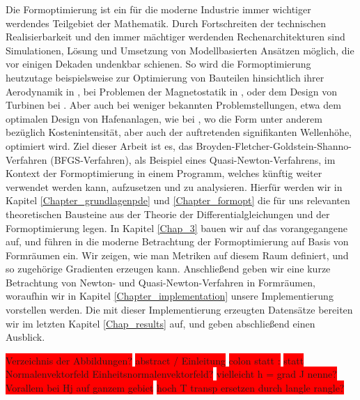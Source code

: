 \documentclass[bibliography=totoc,12pt,a4paper]{scrartcl}
\theoremstyle{exampstyle}
\numberwithin{equation}{section}
\renewenvironment{abstract}
 {\small
  \begin{center}
  \bfseries \abstractname\vspace{-.5em}\vspace{0pt}
  \end{center}
  \list{}{%
    \setlength{\leftmargin}{10mm}%
    \setlength{\rightmargin}{\leftmargin}%
  }%
  \item\relax}
 {\endlist}
\begin{document}
\begin{abstract}
Die Formoptimierung ist ein für die moderne Industrie immer wichtiger werdendes Teilgebiet der Mathematik. Durch Fortschreiten der technischen Realisierbarkeit und den immer mächtiger werdenden Rechenarchitekturen sind Simulationen, Lösung und Umsetzung von Modellbasierten Ansätzen möglich, die vor einigen Dekaden undenkbar schienen. So wird die Formoptimierung heutzutage beispielsweise zur Optimierung von Bauteilen hinsichtlich ihrer Aerodynamik in \cite{abstract1}, bei Problemen der Magnetostatik in \cite{abstract2}, oder dem Design von Turbinen bei \cite{abstract4}. Aber auch bei weniger bekannten Problemstellungen, etwa dem optimalen Design von Hafenanlagen, wie bei \cite{abstract3}, wo die Form unter anderem bezüglich Kostenintensität, aber auch der auftretenden signifikanten Wellenhöhe, optimiert wird. Ziel dieser Arbeit ist es, das Broyden-Fletcher-Goldstein-Shanno-Verfahren (BFGS-Verfahren), als Beispiel eines Quasi-Newton-Verfahrens, im Kontext der Formoptimierung in einem Programm, welches künftig weiter verwendet werden kann, aufzusetzen und zu analysieren. Hierfür werden wir in 
Kapitel \ref{Chapter_grundlagenpde} und \ref{Chapter_formopt} die für uns relevanten theoretischen Bausteine aus der Theorie der Differentialgleichungen und der Formoptimierung legen. In Kapitel \ref{Chap_3} bauen wir auf das vorangegangene auf, und führen in die moderne Betrachtung der Formoptimierung auf Basis von Formräumen ein. Wir zeigen, wie man Metriken auf diesem Raum definiert, und so zugehörige Gradienten erzeugen kann. Anschließend geben wir eine kurze Betrachtung von Newton- und Quasi-Newton-Verfahren in Formräumen, woraufhin wir in Kapitel \ref{Chapter_implementation} unsere Implementierung vorstellen werden. Die mit dieser Implementierung erzeugten Datensätze bereiten wir im letzten Kapitel \ref{Chap_results} auf, und geben abschließend einen Ausblick.
\end{abstract}
\vspace{1cm}

\colorbox{red}{Verzeichnis der Abbildungen?}
\colorbox{red}{abstract / Einleitung}
\colorbox{red}{colon statt :}
\colorbox{red}{statt Normalenvektorfeld Einheitsnormalenvektorfeld?}
\colorbox{red}{vielleicht h = grad J nenne? Vorallem bei Hj auf ganzem gebiet}
\colorbox{red}{hoch T transp ersetzen durch langle rangle?}






\end{document}
